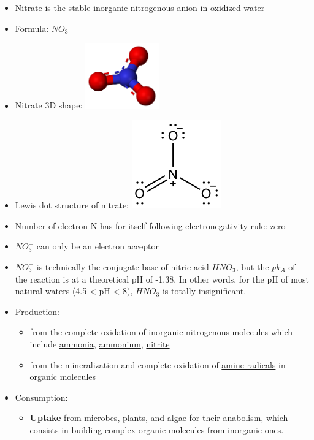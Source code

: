 \documentclass[]{book}
\providecommand{\tightlist}{%
  \setlength{\itemsep}{0pt}\setlength{\parskip}{0pt}}
\theoremstyle{definition}
\theoremstyle{definition}
\theoremstyle{definition}
\theoremstyle{remark}
\begin{document}
\begin{itemize}
\item
  Nitrate is the stable inorganic nitrogenous anion in oxidized water
\item
  Formula: \(NO_3^{-}\)
\item
  Nitrate 3D shape:
  \includegraphics[width=0.25000\textwidth]{pictures/Nitrate-3D-balls.png}
\item
  Lewis dot structure of nitrate:
  \includegraphics{pictures/nitrate_lewis_structure.png}
\item
  Number of electron N has for itself following electronegativity rule:
  zero
\item
  \(NO_3^{-}\) can only be an electron acceptor
\item
  \(NO_3^{-}\) is technically the conjugate base of nitric acid
  \(HNO_3\), but the \(pk_A\) of the reaction is at a theoretical pH of
  -1.38. In other words, for the pH of most natural waters (4.5
  \textless{} pH \textless{} 8), \(HNO_3\) is totally insignificant.
\item
  Production:

  \begin{itemize}
  \tightlist
  \item
    from the complete \protect\hyperlink{oxidation}{oxidation} of
    inorganic nitrogenous molecules which include
    \protect\hyperlink{NH3}{ammonia}, \protect\hyperlink{NH4}{ammonium},
    \protect\hyperlink{NO2}{nitrite}
  \item
    from the mineralization and complete oxidation of
    \protect\hyperlink{amine}{amine radicals} in organic molecules
  \end{itemize}
\item
  Consumption:

  \begin{itemize}
  \tightlist
  \item
    \textbf{Uptake} from microbes, plants, and algae for their
    \protect\hyperlink{anabolism}{anabolism}, which consists in building
    complex organic molecules from inorganic ones.


\end{itemize}
\end{itemize}
\end{document}
